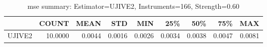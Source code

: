 \begin{table}[ht]
\centering
\caption{mse summary: Estimator=UJIVE2, Instruments=166, Strength=0.60}
\begin{tabular}{lrrrrrrrr}
\toprule
 & COUNT & MEAN & STD & MIN & 25\% & 50\% & 75\% & MAX \\
\midrule
UJIVE2 & 10.0000 & 0.0044 & 0.0016 & 0.0026 & 0.0034 & 0.0038 & 0.0047 & 0.0081 \\
\bottomrule
\end{tabular}
\end{table}
